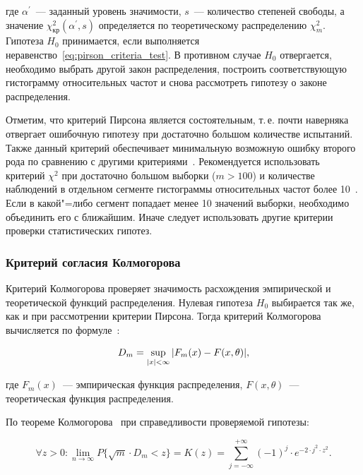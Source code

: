 \documentclass[a4paper, article, 14pt]{extarticle}
\begin{document}
\noindent где $\alpha^{'}$~--- заданный уровень значимости, $s$~--- количество степеней свободы, а значение $\chi_\text{кр}^2(\alpha^{'}, s)$ определяется по теоретическому распределению $\chi_m^2$. Гипотеза $H_0$ принимается, если выполняется неравенство~\eqref{eq:pirson_criteria_test}. В противном случае $H_0$ отвергается, необходимо выбрать другой закон распределения, построить соответствующую гистограмму относительных частот и снова рассмотреть гипотезу о законе распределения.

Отметим, что критерий Пирсона является состоятельным, т.\,е. почти наверняка отвергает ошибочную гипотезу при достаточно большом количестве испытаний. Также данный критерий обеспечивает минимальную возможную ошибку второго рода по сравнению с другими критериями~\cite{smirnov}. Рекомендуется использовать критерий $\chi^2$ при достаточно большом выборки ($m > 100$) и количестве наблюдений в отдельном сегменте гистограммы относительных частот более 10~\cite{koroluk}. Если в какой"=либо сегмент попадает менее 10 значений выборки, необходимо объединить его с ближайшим. Иначе следует использовать другие критерии проверки статистических гипотез.

\subsubsection{Критерий согласия Колмогорова}\label{sec:kolmogorov_criteria}

Критерий Колмогорова проверяет значимость расхождения эмпирической и теоретической функций распределения. Нулевая гипотеза $H_0$ выбирается так же, как и при рассмотрении критерии Пирсона. Тогда критерий Колмогорова вычисляется по формуле~\cite{koroluk}:

\begin{equation}\label{eq:kolmogorov_criteria}
	D_m = \sup_{\abs*{x} < \infty}{\abs*{F_m(x) - F(x, \theta)}},
\end{equation}

\noindent где $F_m(x)$~--- эмпирическая функция распределения, $F(x, \theta)$~--- теоретическая функция распределения.

По теореме Колмогорова~\cite{koroluk} при справедливости проверяемой гипотезы:

\begin{equation}\label{eq:kolmogorov_test}
	\forall z > 0: \lim_{n \rightarrow \infty}{P\{\sqrt{m} \cdot D_m < z\}} = K(z) = \sum_{j = -\infty}^{+\infty}{(-1)^j \cdot e^{-2 \cdot j^2 \cdot z^2}}.
\end{equation}
\end{document}
